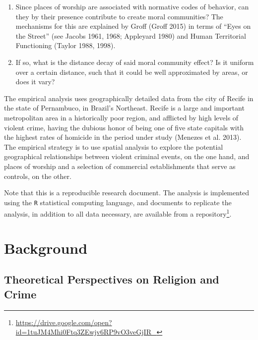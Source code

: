 \documentclass[smallextended]{svjour3}       %
\begin{document}
\begin{enumerate}
\def\labelenumi{\arabic{enumi}.}
\item
  Since places of worship are associated with normative codes of
  behavior, can they by their presence contribute to create moral
  communities? The mechanisms for this are explained by Groff (Groff
  2015) in terms of ``Eyes on the Street'' (see Jacobs 1961, 1968;
  Appleyard 1980) and Human Territorial Functioning (Taylor 1988, 1998).
\item
  If so, what is the distance decay of said moral community effect? Is
  it uniform over a certain distance, such that it could be well
  approximated by areas, or does it vary?
\end{enumerate}

The empirical analysis uses geographically detailed data from the city
of Recife in the state of Pernambuco, in Brazil's Northeast. Recife is a
large and important metropolitan area in a historically poor region, and
afflicted by high levels of violent crime, having the dubious honor of
being one of five state capitals with the highest rates of homicide in
the period under study (Menezes et al. 2013). The empirical strategy is
to use spatial analysis to explore the potential geographical
relationships between violent criminal events, on the one hand, and
places of worship and a selection of commercial establishments that
serve as controls, on the other.

Note that this is a reproducible research document. The analysis is
implemented using the \texttt{R} statistical computing language, and
documents to replicate the analysis, in addition to all data necessary,
are available from a
repository\footnote{\url{https://drive.google.com/open?id=1tuJM4Mhi0Ftq3ZEwjv6RP9vO3veGjIR_}}.

\hypertarget{background}{%
\section{Background}\label{background}}

\hypertarget{theoretical-perspectives-on-religion-and-crime}{%
\subsection{Theoretical Perspectives on Religion and
Crime}\label{theoretical-perspectives-on-religion-and-crime}}
\end{document}
